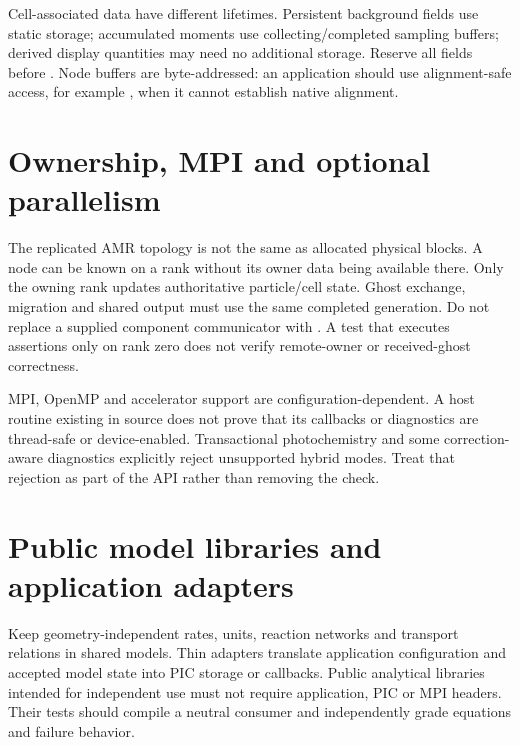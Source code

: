 Cell-associated data have different lifetimes. Persistent background fields
use static storage; accumulated moments use collecting/completed sampling
buffers; derived display quantities may need no additional storage. Reserve
all fields before . Node buffers
are byte-addressed: an application should use alignment-safe access, for
example , when it cannot establish native alignment.

\section{Ownership, MPI and optional parallelism}
The replicated AMR topology is not the same as allocated physical blocks.
A node can be known on a rank without its owner data being available there.
Only the owning rank updates authoritative particle/cell state. Ghost
exchange, migration and shared output must use the same completed generation.
Do not replace a supplied component communicator with
. A test that executes assertions only on rank zero does
not verify remote-owner or received-ghost correctness.

MPI, OpenMP and accelerator support are configuration-dependent. A host
routine existing in source does not prove that its callbacks or diagnostics
are thread-safe or device-enabled. Transactional photochemistry and some
correction-aware diagnostics explicitly reject unsupported hybrid modes.
Treat that rejection as part of the API rather than removing the check.

\section{Public model libraries and application adapters}
Keep geometry-independent rates, units, reaction networks and transport
relations in shared models. Thin adapters translate application configuration
and accepted model state into PIC storage or callbacks. Public analytical
libraries intended for independent use must not require application, PIC or
MPI headers. Their tests should compile a neutral consumer and independently
grade equations and failure behavior.
